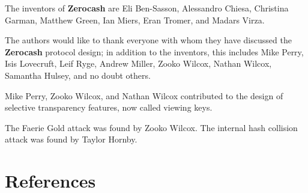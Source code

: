 \documentclass{article}
\newcommand{\termbf}[1]{\textbf{#1}\xspace}
\newcommand{\Zerocash}{\termbf{Zerocash}}
\begin{document}
The inventors of \Zerocash are Eli Ben-Sasson, Alessandro Chiesa,
Christina Garman, Matthew Green, Ian Miers, Eran Tromer, and Madars
Virza.

The authors would like to thank everyone with whom they have discussed
the \Zerocash protocol design; in addition to the inventors, this includes
Mike Perry, Isis Lovecruft, Leif Ryge, Andrew Miller, Zooko Wilcox,
Nathan Wilcox, Samantha Hulsey, and no doubt others.

Mike Perry, Zooko Wilcox, and Nathan Wilcox contributed to the design
of selective transparency features, now called viewing keys.

The Faerie Gold attack was found by Zooko Wilcox.
The internal hash collision attack was found by Taylor Hornby.


\section{References}

\begingroup
\renewcommand{\section}[2]{}


\endgroup
\end{document}
